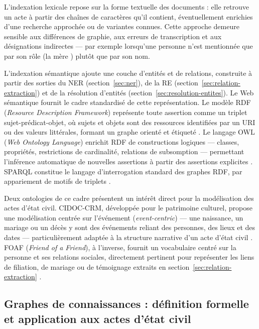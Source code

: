 L'indexation lexicale repose sur la forme textuelle des documents : elle retrouve un acte à partir des chaînes de caractères qu'il contient, éventuellement enrichies d'une recherche approchée ou de variantes connues.
Cette approche demeure sensible aux différences de graphie, aux erreurs de transcription et aux désignations indirectes --- par exemple lorsqu'une personne n'est mentionnée que par son rôle (\og la mère \fg{}) plutôt que par son nom.

L'indexation sémantique ajoute une couche d'entités et de relations, construite à partir des sorties du NER (section~\ref{sec:ner}), de la RE (section~\ref{sec:relation-extraction}) et de la résolution d'entités (section~\ref{sec:resolution-entites}).
Le Web sémantique fournit le cadre standardisé de cette représentation.
Le modèle RDF (\textit{Resource Description Framework}) représente toute assertion comme un triplet sujet-prédicat-objet, où sujets et objets sont des ressources identifiées par un URI ou des valeurs littérales, formant un graphe orienté et étiqueté \cite{w3c2014rdf}.
Le langage OWL (\textit{Web Ontology Language}) enrichit RDF de constructions logiques --- classes, propriétés, restrictions de cardinalité, relations de subsomption --- permettant l'inférence automatique de nouvelles assertions à partir des assertions explicites \cite{w3c2012owl}.
SPARQL constitue le langage d'interrogation standard des graphes RDF, par appariement de motifs de triplets \cite{w3c2013sparql}.

Deux ontologies de ce cadre présentent un intérêt direct pour la modélisation des actes d'état civil.
CIDOC-CRM, développée pour le patrimoine culturel, propose une modélisation centrée sur l'événement (\textit{event-centric}) --- une naissance, un mariage ou un décès y sont des événements reliant des personnes, des lieux et des dates --- particulièrement adaptée à la structure narrative d'un acte d'état civil \cite{iso21127cidoccrm}.
FOAF (\textit{Friend of a Friend}), à l'inverse, fournit un vocabulaire centré sur la personne et ses relations sociales, directement pertinent pour représenter les liens de filiation, de mariage ou de témoignage extraits en section~\ref{sec:relation-extraction} \cite{brickley2014foaf}.

\subsection{Graphes de connaissances : définition formelle et application aux actes d'état civil}
\label{sec:graphe-connaissances}

